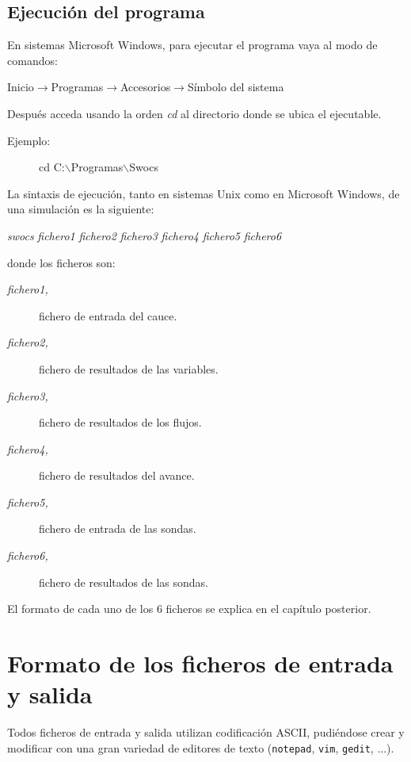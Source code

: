\documentclass[a4paper,12pt]{report}
\begin{document}
\section{Ejecución del programa}

En sistemas Microsoft Windows, para ejecutar el programa vaya al modo de
comandos:
\begin{description}
\item[Inicio$\rightarrow$Programas$\rightarrow$Accesorios$\rightarrow$Símbolo del sistema]
\end{description}
Después acceda usando la orden \emph{cd} al directorio donde se ubica el
ejecutable.
\begin{description}
\item[Ejemplo:] cd C:$\backslash$Programas$\backslash$Swocs
\end{description}

La sintaxis de ejecución, tanto en sistemas Unix como en Microsoft Windows, de
una simulación es la siguiente:
\begin{description}
\item \emph{swocs}  \emph{fichero1} \emph{fichero2} \emph{fichero3}
	\emph{fichero4} \emph{fichero5} \emph{fichero6}
\end{description}
donde los ficheros son:
\begin{description}
\item[\it fichero1,] fichero de entrada del cauce.
\item[\it fichero2,] fichero de resultados de las variables.
\item[\it fichero3,] fichero de resultados de los flujos.
\item[\it fichero4,] fichero de resultados del avance.
\item[\it fichero5,] fichero de entrada de las sondas.
\item[\it fichero6,] fichero de resultados de las sondas.
\end{description}

El formato de cada uno de los 6 ficheros se explica en el capítulo posterior.

\chapter{Formato de los ficheros de entrada y salida}

Todos ficheros de entrada y salida utilizan codificación ASCII, pudiéndose
crear y modificar  con una gran variedad de editores de texto ({\tt notepad},
{\tt vim}, {\tt gedit}, ...).
\end{document}
